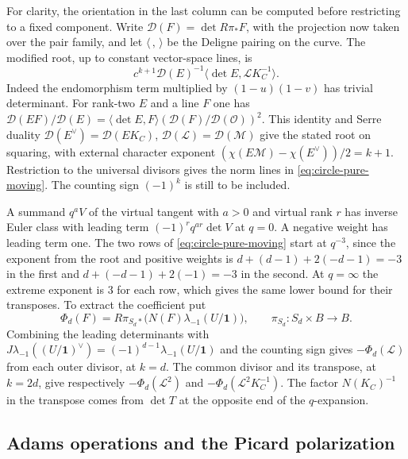 For clarity, the orientation in the last column can be computed
before restricting to a fixed component. Write
\(\mathcal D(F)=\det R\pi_*F\), with the projection now taken over
the pair family, and let \(\langle\, ,\,\rangle\) be the Deligne
pairing on the curve. The modified root, up to constant
vector-space lines, is
\[
 c^{k+1}\mathcal D(E)^{-1}
             \langle\det E,\mathcal L K_C^{-1}\rangle .
\]
Indeed the endomorphism term multiplied by \((1-u)(1-v)\) has
trivial determinant. For rank-two \(E\) and a line \(F\) one has
\(\mathcal D(EF)/\mathcal D(E)
=\langle\det E,F\rangle
 (\mathcal D(F)/\mathcal D(\mathcal O))^2\).
This identity and Serre duality
\(\mathcal D(E^\vee)=\mathcal D(EK_C)\),
\(\mathcal D(\mathcal L)=\mathcal D(\mathcal M)\)
give the stated root on squaring, with external character exponent
\((\chi(E\mathcal M)-\chi(E^\vee))/2=k+1\).
Restriction to the universal divisors gives the norm lines in
\eqref{eq:circle-pure-moving}. The counting sign \((-1)^k\) is
still to be included.

A summand \(q^a V\) of the virtual tangent with \(a>0\) and virtual
rank \(r\) has inverse Euler class with leading term
\((-1)^r q^{ar}\det V\) at \(q=0\). A negative weight has leading
term one. The two rows of \eqref{eq:circle-pure-moving} start at
\(q^{-3}\), since the exponent from the root and positive weights is
\(d+(d-1)+2(-d-1)=-3\) in the first and
\(d+(-d-1)+2(-1)=-3\) in the second. At \(q=\infty\) the extreme
exponent is \(3\) for each row, which gives the same lower bound
for their transposes. To extract the coefficient put
\[
 \Phi_d(F)=R\pi_{S_d*}\bigl(N(F)\lambda_{-1}(U/\mathbf1)\bigr),
 \qquad \pi_{S_d}:S_d\times B\longrightarrow B .
\]
Combining the leading determinants with
\(J\lambda_{-1}((U/\mathbf1)^\vee)
=(-1)^{d-1}\lambda_{-1}(U/\mathbf1)\) and the counting sign gives
\(-\Phi_d(\mathcal L)\) from each outer divisor, at \(k=d\).
The common divisor and its transpose, at \(k=2d\), give respectively
\(-\Phi_d(\mathcal L^2)\) and
\(-\Phi_d(\mathcal L^2K_C^{-1})\). The factor \(N(K_C)^{-1}\)
in the transpose comes from \(\det T\) at the opposite end of
the \(q\)-expansion.

\subsection{Adams operations and the Picard polarization}


